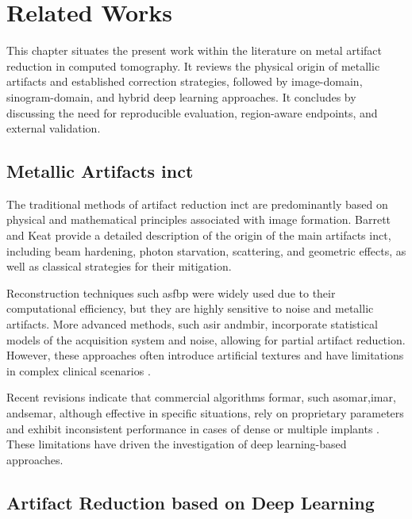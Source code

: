 \chapter{Related Works}
\label{chap:final-related-works}
This chapter situates the present work within the literature on metal artifact reduction in computed tomography. It reviews the physical origin of metallic artifacts and established correction strategies, followed by image-domain, sinogram-domain, and hybrid deep learning approaches. It concludes by discussing the need for reproducible evaluation, region-aware endpoints, and external validation.

\section{Metallic Artifacts in\acrshort{ct}}

The traditional methods of artifact reduction in\acrshort{ct} are predominantly based on physical and mathematical principles associated with image formation. Barrett and Keat \cite{barrettArtifactsCTRecognition2004} provide a detailed description of the origin of the main artifacts in\acrshort{ct}, including beam hardening, photon starvation, scattering, and geometric effects, as well as classical strategies for their mitigation.

Reconstruction techniques such as\acrshort{fbp} were widely used due to their computational efficiency, but they are highly sensitive to noise and metallic artifacts. More advanced methods, such as\acrfull{ir} and\acrshort{mbir}, incorporate statistical models of the acquisition system and noise, allowing for partial artifact reduction. However, these approaches often introduce artificial textures and have limitations in complex clinical scenarios \cite{sahuTransformingCTImaging2025}.

Recent revisions indicate that commercial algorithms for\acrshort{mar}, such as\acrfull{omar},\acrfull{imar}, and\acrfull{semar}, although effective in specific situations, rely on proprietary parameters and exhibit inconsistent performance in cases of dense or multiple implants \cite{kleberAdvancementsSupervisedDeep2024, sellesAdvancesMetalArtifact2024}. These limitations have driven the investigation of deep learning-based approaches. 

\section{Artifact Reduction based on Deep Learning}

